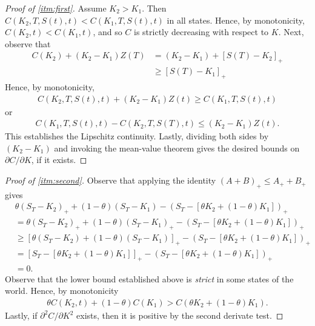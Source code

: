 \documentclass[12pt]{article}
\newcommand{\p}{\partial}
\theoremstyle{plain}
\theoremstyle{definition}
\theoremstyle{remark}
\numberwithin{equation}{section}  %
\begin{document}
\begin{proof}[Proof of \cref{itm:first}]
	Assume $K_{2} > K_{1}$. Then $C(K_{2}, T, S(t), t) < C(K_{1}, T, S(t), t)$
	in all states. Hence, by monotonicity, $C(K_{2}, t) < C(K_{1}, t)$, and so
	$C$ is  strictly decreasing with respect to $K$. Next, observe that
	\begin{equation*}
		\begin{split}
			C(K_{2}) + (K_{2} - K_{1})Z(T)
			& = (K_{2} - K_{1}) + {[S(T) - K_{2}]}_{+}
			\\
			& 
			\ge {[S(T) - K_{1}]}_{+}
		\end{split}
	\end{equation*}
	Hence, by monotonicity,
	\begin{equation*}
		\begin{split}
			C(K_{2}, T, S(t), t) + (K_{2} - K_{1})Z(t) \ge C(K_{1}, T, S(t), t)
		\end{split}
	\end{equation*}
	or
	\begin{equation*}
		\begin{split}
			C(K_{1}, T, S(t), t) - C(K_{2}, T, S(T), t) \le (K_{2} - K_{1})Z(t).
		\end{split}
	\end{equation*}
	This establishes the Lipschitz continuity. Lastly, dividing both sides by 
	$(K_{2} - K_{1})$ and invoking the mean-value theorem
	gives the desired bounds on $\p C/ \p K$, if it exists.
\end{proof}
\begin{proof}[Proof of \cref{itm:second}]
	Observe that applying the identity ${(A + B)}_{+} \le A_{+} + B_{+}$
	gives
	\begin{equation*}
		\begin{split}
			& \theta{(S_{T} - K_{2})}_{+} + (1 - \theta)(S_{T} - K_{1})
			- {(S_{T} - [\theta K_{2} + (1 - \theta)K_{1}])}_{+}
			\\
			& = \theta{(S_{T} - K_{2})}_{+} + (1 - \theta){(S_{T} - K_{1})}_{+}
			- {\left( S_{T} - [\theta K_{2} + (1 - \theta)K_{1}] \right)}_{+}
			\\
			& \ge {[\theta(S_{T} - K_{2}) + (1 - \theta)(S_{T} - K_{1})]}_{+}
			- {\left( S_{T} - \left[ \theta K_{2} + (1 - \theta)K_{1} \right]
				\right)}_{+}
			\\
			& = {\left[ S_{T} - [\theta K_{2} + (1 - \theta)K_{1}] \right]}_{+}
			- {\left( S_{T} - \left[ \theta K_{2} + (1 - \theta)K_{1} \right]
				\right)}_{+}
			\\
			& = 0.
		\end{split}
	\end{equation*}
	Observe that the lower bound established above is \emph{strict}
	in some states of the world. Hence, by monotonicity
	\begin{equation*}
		\begin{split}
			\theta C(K_{2}, t) + (1 - \theta)C(K_{1}) > C(\theta K_{2} + (1 -
			\theta)K_{1}).
		\end{split}
	\end{equation*}
	Lastly, if $\p^2 C/ \p K^2$ exists, then it is positive by the second
	derivate test.
\end{proof}
\end{document}
